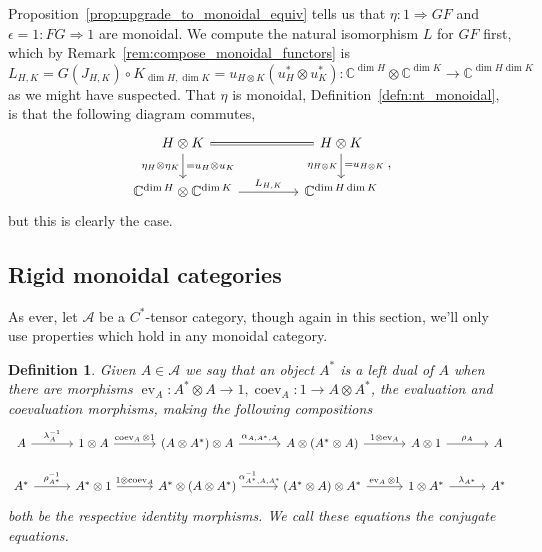\documentclass[a4paper,11pt]{article}
\theoremstyle{plain}
\newtheorem{definition}[proposition]{Definition}
\theoremstyle{remark}
\newenvironment{example}
  {\pushQED{\qed}\renewcommand{\qedsymbol}{$\triangle$}\examplex}
  {\popQED\endexamplex}
\newcommand{\mc}[1]{\mathcal{#1}}
\newcommand{\ev}{\operatorname{ev}}
\newcommand{\coev}{\operatorname{coev}}
\begin{document}
\begin{example}
Proposition~\ref{prop:upgrade_to_monoidal_equiv} tells us that $\eta \colon 1 \Rightarrow GF$ and $\epsilon=1\colon FG\Rightarrow 1$ are monoidal.  We compute the natural isomorphism $L$ for $GF$ first, which by Remark~\ref{rem:compose_monoidal_functors} is $L_{H,K} = G(J_{H,K}) \circ K_{\dim H,\dim K} = u_{H\otimes K}(u_H^* \otimes u_K^*) \colon \mathbb C^{\dim H} \otimes \mathbb C^{\dim K} \to \mathbb C^{\dim H\dim K}$ as we might have suspected.  That $\eta$ is monoidal, Definition~\ref{defn:nt_monoidal}, is that the following diagram commutes,
\[\begin{tikzcd}[column sep=10ex]
H \otimes K \ar[r, equals] \ar[d, "\eta_H\otimes\eta_K"', "=u_H\otimes u_K"] & H\otimes K  \ar[d, "\eta_{H\otimes K}"', "=u_{H\otimes K}"] \\
\mathbb C^{\dim H} \otimes \mathbb C^{\dim K} \ar[r, "L_{H,K}"] & \mathbb C^{\dim H\dim K}
\end{tikzcd},\]
but this is clearly the case.
\end{example}


\subsection{Rigid monoidal categories}

As ever, let $\mc A$ be a $C^*$-tensor category, though again in this section, we'll only use properties which hold in any monoidal category.

\begin{definition}\label{defn:leftdual}
Given $A\in\mc A$ we say that an object $A^*$ is a \emph{left dual} of $A$ when there are morphisms $\ev_A \colon A^*\otimes A \to 1, \coev_A \colon 1 \to A \otimes A^*$, the \emph{evaluation} and \emph{coevaluation} morphisms, making the following compositions
\[\begin{tikzcd}[column sep=6.9ex]
  A \ar[r, "\lambda_A^{-1}"]
    & 1 \otimes A \ar[r, "\coev_A \otimes 1"]
    & (A\otimes A^*)\otimes A \ar[r, "\alpha_{A,A^*,A}"]
    & A\otimes (A^*\otimes A) \ar[r, "1\otimes \ev_A"]
    & A\otimes 1 \ar[r, "\rho_{A}"]
    & A  \\
  A^* \ar[r, "\rho_{A^*}^{-1}"]
    & A^* \otimes 1 \ar[r, "1\otimes\coev_A"]
    & A^*\otimes (A\otimes A^*) \ar[r, "\alpha_{A^*,A,A^*}^{-1}"]
    & (A^*\otimes A)\otimes A^* \ar[r, "\ev_A\otimes 1"]
    & 1 \otimes A^* \ar[r, "\lambda_{A^*}"]
    & A^*
\end{tikzcd}\]
both be the respective identity morphisms.  We call these equations the \emph{conjugate equations}.
\end{definition}
\end{document}
